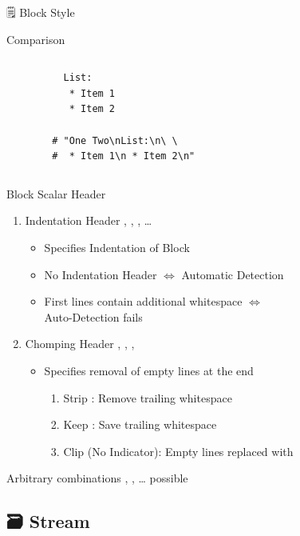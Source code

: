 \documentclass{beamer}
\newcommand{\code}[1]{
  \codebox{\texttt|#1|}
}
\begin{document}
\begin{frame}{🗒 Block Style}
\begin{block}{Comparison}
\begin{columns}
\begin{verbatim}
          List:
           * Item 1
           * Item 2

        # "One Two\nList:\n\ \
        #  * Item 1\n * Item 2\n"
      \end{verbatim}

    \end{columns}
  \end{block}
  \hspace{0pt}
  \vfill

  \newpage
  \begin{block}{Block Scalar Header}
    \begin{enumerate}
      \item Indentation Header , \code{>2}, \code{>5}, …
      \begin{itemize}
        \item Specifies Indentation of Block
        \item No Indentation Header $⇔$ Automatic Detection
        \item First lines contain additional whitespace $⇔$ \\
              \alert{Auto-Detection fails}
      \end{itemize}
      \item Chomping Header \codebox{\texttt{|-}}, \codebox{\texttt{|+}}, \code{>-}, \code{>+}
      \begin{itemize}
        \item Specifies removal of empty lines \alert{at the end}
        \begin{enumerate}
          \item Strip \code{-}: Remove trailing whitespace
          \item Keep \code{+}: Save trailing whitespace
          \item Clip (No Indicator): Empty lines replaced with \code{\n}
        \end{enumerate}
      \end{itemize}
    \end{enumerate}
    Arbitrary combinations , \code{>4+}, … possible
  \end{block}

\end{frame}

\subsection{🗃 Stream}
\end{document}

